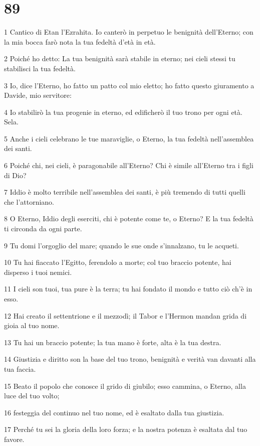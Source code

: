 \chapter{89}

\par 1 Cantico di Etan l'Ezrahita. Io canterò in perpetuo le benignità dell'Eterno; con la mia bocca farò nota la tua fedeltà d'età in età.
\par 2 Poiché ho detto: La tua benignità sarà stabile in eterno; nei cieli stessi tu stabilisci la tua fedeltà.
\par 3 Io, dice l'Eterno, ho fatto un patto col mio eletto; ho fatto questo giuramento a Davide, mio servitore:
\par 4 Io stabilirò la tua progenie in eterno, ed edificherò il tuo trono per ogni età. Sela.
\par 5 Anche i cieli celebrano le tue maraviglie, o Eterno, la tua fedeltà nell'assemblea dei santi.
\par 6 Poiché chi, nei cieli, è paragonabile all'Eterno? Chi è simile all'Eterno tra i figli di Dio?
\par 7 Iddio è molto terribile nell'assemblea dei santi, è più tremendo di tutti quelli che l'attorniano.
\par 8 O Eterno, Iddio degli eserciti, chi è potente come te, o Eterno? E la tua fedeltà ti circonda da ogni parte.
\par 9 Tu domi l'orgoglio del mare; quando le sue onde s'innalzano, tu le acqueti.
\par 10 Tu hai fiaccato l'Egitto, ferendolo a morte; col tuo braccio potente, hai disperso i tuoi nemici.
\par 11 I cieli son tuoi, tua pure è la terra; tu hai fondato il mondo e tutto ciò ch'è in esso.
\par 12 Hai creato il settentrione e il mezzodì; il Tabor e l'Hermon mandan grida di gioia al tuo nome.
\par 13 Tu hai un braccio potente; la tua mano è forte, alta è la tua destra.
\par 14 Giustizia e diritto son la base del tuo trono, benignità e verità van davanti alla tua faccia.
\par 15 Beato il popolo che conosce il grido di giubilo; esso cammina, o Eterno, alla luce del tuo volto;
\par 16 festeggia del continuo nel tuo nome, ed è esaltato dalla tua giustizia.
\par 17 Perché tu sei la gloria della loro forza; e la nostra potenza è esaltata dal tuo favore.
